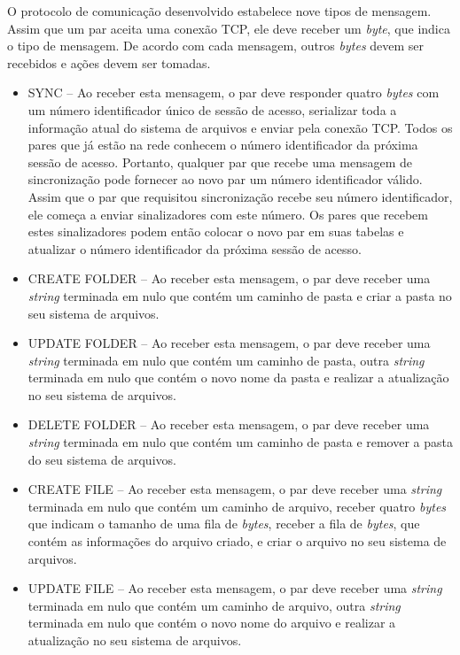 \documentclass{article}
\begin{document}
\indent

O protocolo de comunicação desenvolvido estabelece nove tipos de mensagem. Assim que um par aceita uma conexão TCP, ele deve receber um \textit{byte}, que indica o tipo de mensagem. De acordo com cada mensagem, outros \textit{bytes} devem ser recebidos e ações devem ser tomadas.

\begin{itemize}
	\item SYNC -- Ao receber esta mensagem, o par deve responder quatro \textit{bytes} com um número identificador único de sessão de acesso, serializar toda a informação atual do sistema de arquivos e enviar pela conexão TCP. Todos os pares que já estão na rede conhecem o número identificador da próxima sessão de acesso. Portanto, qualquer par que recebe uma mensagem de sincronização pode fornecer ao novo par um número identificador válido. Assim que o par que requisitou sincronização recebe seu número identificador, ele começa a enviar sinalizadores com este número. Os pares que recebem estes sinalizadores podem então colocar o novo par em suas tabelas e atualizar o número identificador da próxima sessão de acesso.
	\item CREATE FOLDER -- Ao receber esta mensagem, o par deve receber uma \textit{string} terminada em nulo que contém um caminho de pasta e criar a pasta no seu sistema de arquivos.
	\item UPDATE FOLDER -- Ao receber esta mensagem, o par deve receber uma \textit{string} terminada em nulo que contém um caminho de pasta, outra \textit{string} terminada em nulo que contém o novo nome da pasta e realizar a atualização no seu sistema de arquivos.
	\item DELETE FOLDER -- Ao receber esta mensagem, o par deve receber uma \textit{string} terminada em nulo que contém um caminho de pasta e remover a pasta do seu sistema de arquivos.
	\item CREATE FILE -- Ao receber esta mensagem, o par deve receber uma \textit{string} terminada em nulo que contém um caminho de arquivo, receber quatro \textit{bytes} que indicam o tamanho de uma fila de \textit{bytes}, receber a fila de \textit{bytes}, que contém as informações do arquivo criado, e criar o arquivo no seu sistema de arquivos.
	\item UPDATE FILE -- Ao receber esta mensagem, o par deve receber uma \textit{string} terminada em nulo que contém um caminho de arquivo, outra \textit{string} terminada em nulo que contém o novo nome do arquivo e realizar a atualização no seu sistema de arquivos.

\end{itemize}
\end{document}
